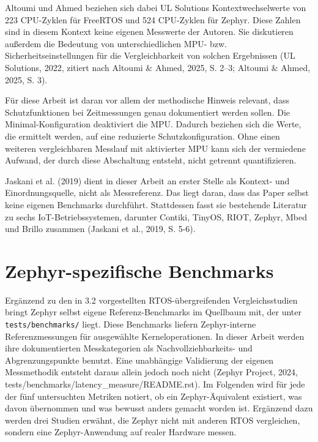 Altoumi und Ahmed beziehen sich dabei UL Solutions Kontextwechselwerte von 223 CPU-Zyklen f{\"u}r FreeRTOS und 524 CPU-Zyklen f{\"u}r Zephyr. Diese Zahlen sind in diesem Kontext keine eigenen Messwerte der Autoren. Sie diskutieren au{\ss}erdem die Bedeutung von unterschiedlichen MPU- bzw. Sicherheitseinstellungen f{\"u}r die Vergleichbarkeit von solchen Ergebnissen (UL Solutions, 2022, zitiert nach Altoumi \& Ahmed, 2025, S. 2--3; Altoumi \& Ahmed, 2025, S. 3).

F{\"u}r diese Arbeit ist daran vor allem der methodische Hinweis relevant, dass Schutzfunktionen bei Zeitmessungen genau dokumentiert werden sollen. Die Minimal-Konfiguration deaktiviert die MPU. Dadurch beziehen sich die Werte, die ermittelt werden, auf eine reduzierte Schutzkonfiguration. Ohne einen weiteren vergleichbaren Messlauf mit aktivierter MPU kann sich der vermiedene Aufwand, der durch diese Abschaltung entsteht, nicht getrennt quantifizieren.

Jaskani et al. (2019) dient in dieser Arbeit an erster Stelle als Kontext- und Einordnungsquelle, nicht als Messreferenz. Das liegt daran, dass das Paper selbst keine eigenen Benchmarks durchf{\"u}hrt. Stattdessen fasst sie bestehende Literatur zu sechs IoT-Betriebssystemen, darunter Contiki, TinyOS, RIOT, Zephyr, Mbed und Brillo zusammen (Jaskani et al., 2019, S. 5-6).

\section{Zephyr-spezifische Benchmarks}
Erg{\"a}nzend zu den in 3.2 vorgestellten RTOS-{\"u}bergreifenden Vergleichsstudien bringt Zephyr selbst eigene Referenz-Benchmarks im Quellbaum mit, der unter \lstinline[style=codeinline]|tests/benchmarks/| liegt. Diese Benchmarks liefern Zephyr-interne Referenzmessungen f{\"u}r ausgew{\"a}hlte Kerneloperationen. In dieser Arbeit werden ihre dokumentierten Messkategorien als Nachvollziehbarkeits- und Abgrenzungspunkte benutzt. Eine unabh{\"a}ngige Validierung der eigenen Messmethodik entsteht daraus allein jedoch noch nicht (Zephyr Project, 2024, tests/benchmarks/latency\_measure/README.rst). Im Folgenden wird f{\"u}r jede der f{\"u}nf untersuchten Metriken notiert, ob ein Zephyr-{\"A}quivalent existiert, was davon {\"u}bernommen und was bewusst anders gemacht worden ist. Erg{\"a}nzend dazu werden drei Studien erw{\"a}hnt, die Zephyr nicht mit anderen RTOS vergleichen, sondern eine Zephyr-Anwendung auf realer Hardware messen.

